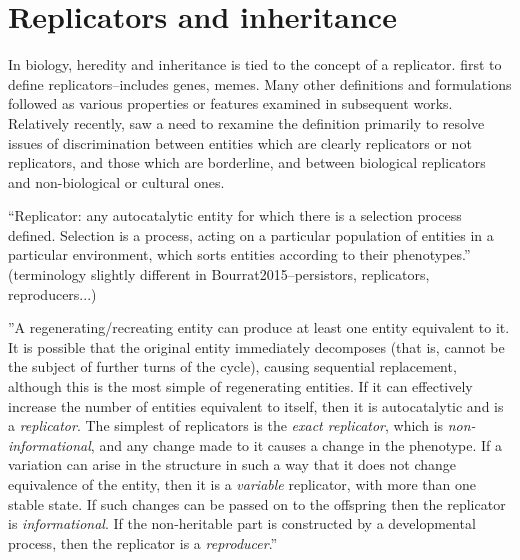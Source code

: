 \section{Replicators and inheritance}
\begin{NOTES}
In biology, heredity and inheritance is tied to the concept of a replicator. \Cite{Dawkins1976} first to define replicators--includes genes, memes. Many other definitions and formulations followed as various properties or features examined in subsequent works. Relatively recently, \cite{Zachar2010} saw a need to rexamine the definition primarily to resolve issues of discrimination between entities which are clearly replicators or not replicators, and those which are borderline, and between biological replicators and non-biological or cultural ones. 

``Replicator: any autocatalytic entity for which there is a selection process defined. Selection is a process, acting on a particular population of entities in a particular environment, which sorts entities according to their phenotypes.'' \parencite[p.21]{Zachar2010} (terminology slightly different in Bourrat2015--persistors, replicators, reproducers...)

''A regenerating/recreating entity can produce at least one entity equivalent to it. It is possible that the original entity immediately decomposes (that is, cannot be the subject of further turns of the cycle), causing sequential replacement, although this is the most simple of regenerating entities. If it can effectively increase the number of entities equivalent to itself, then it is autocatalytic and is a \emph{replicator}. The simplest of replicators is the \emph{exact replicator}, which is \emph{non-informational}, and any change made to it causes a change in the phenotype. If a variation can arise in the structure in such a way that it does not change equivalence of the entity, then it is a \emph{variable} replicator, with more than one stable state. If such changes can be passed on to the offspring then the replicator is \emph{informational}. If the non-heritable part is constructed by a developmental process, then the replicator is a \emph{reproducer}.'' \parencite[p.21]{Zachar2010}

\end{NOTES}

